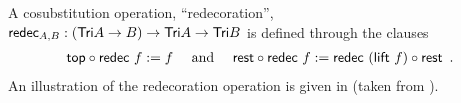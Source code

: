 \documentclass[a4paper,USenglish]{lipics}
\begin{document}
\begin{ex}
 

 

\begin{comment}
\begin{figure}[bt]
  \centering

     \def\extraVskip{3pt}
     \def\proofSkipAmount{\vskip.8ex plus.8ex minus.4ex}
    \AxiomC{$t : \Tri~A$} %
     \UnaryInfC{$\head_A~t : A$}
      \DisplayProof
                        \hspace{3ex}
                                       \AxiomC{$t : \Tri~A$}%
                                       \UnaryInfC{$\tail_A~t : \Tri(E\times A)$}
                                       \DisplayProof%
% 
% 
% 
 \hspace{3ex}
                                            \def\extraVskip{3pt}
     \def\proofSkipAmount{\vskip.8ex plus.8ex minus.4ex}
    \AxiomC{$t \sim t'$}%
     \UnaryInfC{$\head~t = \head~t'$}
      \DisplayProof
                        \hspace{3ex}
                                       \AxiomC{$t \sim t'$}%
                                       \UnaryInfC{$ \tail~t \sim \tail~t'$}
                                       \DisplayProof   

  \caption{Destructors and bisimilarity for the coinductive family $\Tri$} \label{fig:tri_destructors}
\end{figure}
\end{comment}
% 
% 
  A cosubstitution operation, \enquote{redecoration},
    $ \mathsf{redec}_{A,B} : (\mathsf{Tri} A \to B) \to \mathsf{Tri} A \to \mathsf{Tri} B$
  is defined  through the clauses
% 
  \begin{align} {\ensuremath{\mathsf{top}}} \circ {\ensuremath{\mathsf{redec}}~f} := f \quad\text{ and } \quad
                  {\ensuremath{\mathsf{rest}}} \circ {\ensuremath{\mathsf{redec}}~f} := {\mathsf{redec}~(\mathsf{lift}~f)} \circ {\ensuremath{\mathsf{rest}}} \enspace . \label{eq:rest_redec}
    \end{align}
An illustration of the redecoration operation is given in  (taken from \cite{DBLP:conf/types/MatthesP11}).    
\begin{figure}[bt]
  \centering
\end{figure}
\end{ex}
\end{document}
